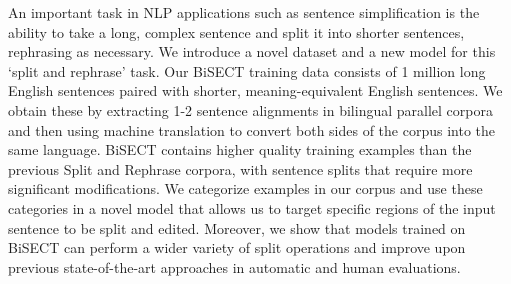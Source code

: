 An important task in NLP applications such as sentence simplification is the ability to take a long, complex sentence and split it into shorter sentences, rephrasing as necessary.  We introduce a novel dataset and a new model for this `split and rephrase' task. Our BiSECT training data consists of 1 million long English sentences paired with shorter, meaning-equivalent English sentences. We obtain these by extracting 1-2 sentence alignments in bilingual parallel corpora and then using machine translation to convert both sides of the corpus into the same language. BiSECT contains higher quality training examples than the previous Split and Rephrase corpora, with sentence splits that require more significant modifications. We categorize examples in our corpus and use these categories in a novel model that allows us to target specific regions of the input sentence to be split and edited. Moreover, we show that models trained on BiSECT can perform a wider variety of split operations and improve upon previous state-of-the-art approaches in automatic and human evaluations.
